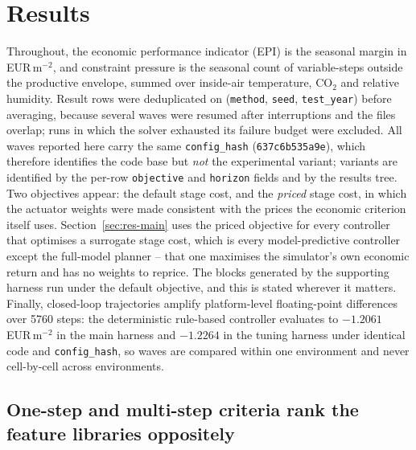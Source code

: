 
\section{Results}
\label{sec:results}

Throughout, the economic performance indicator (EPI) is the seasonal margin in
EUR\,m$^{-2}$, and constraint pressure is the seasonal count of variable-steps outside the
productive envelope, summed over inside-air temperature, CO$_2$ and relative humidity. Result rows were deduplicated on
(\texttt{method}, \texttt{seed}, \texttt{test\_year}) before averaging, because several
waves were resumed after interruptions and the files overlap; runs in which the solver
exhausted its failure budget were excluded. All waves reported here carry the same
\texttt{config\_hash} (\texttt{637c6b535a9e}), which therefore identifies the code base but
\emph{not} the experimental variant; variants are identified by the per-row
\texttt{objective} and \texttt{horizon} fields and by the results tree. Two objectives
appear: the default stage cost, and the \emph{priced} stage cost, in which the actuator
weights were made consistent with the prices the economic criterion itself uses.
Section~\ref{sec:res-main} uses the priced objective for every controller that optimises a
surrogate stage cost, which is every model-predictive controller except the full-model
planner -- that one maximises the simulator's own economic return and has no weights to
reprice. The blocks generated by the supporting harness run under the default objective,
and this is stated wherever it matters. Finally, closed-loop trajectories
amplify platform-level floating-point differences over 5760 steps: the deterministic
rule-based controller evaluates to $-1.2061$ EUR\,m$^{-2}$ in the main harness and
$-1.2264$ in the tuning harness under identical code and \texttt{config\_hash}, so waves
are compared within one environment and never cell-by-cell across environments.

\subsection{One-step and multi-step criteria rank the feature libraries oppositely}
\label{sec:res-ladder}

